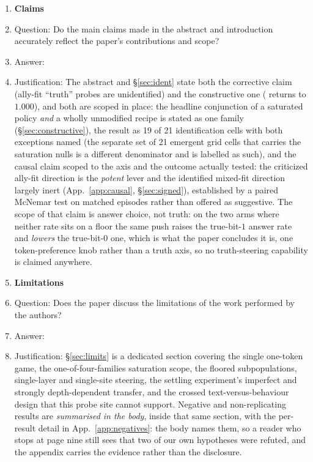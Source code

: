 \begin{enumerate}

\item {\bf Claims}
    \item[] Question: Do the main claims made in the abstract and introduction accurately reflect the paper's contributions and scope?
    \item[] Answer: \answerYes{}
    \item[] Justification: The abstract and \S\ref{sec:ident} state both the corrective claim (ally-fit ``truth'' probes are unidentified) and the constructive one (\tm{} returns to $1.000$), and both are scoped in place: the headline conjunction of a saturated policy \emph{and} a wholly unmodified recipe is stated as one family (\S\ref{sec:constructive}), the \tm{} result as 19 of 21 identification cells with both exceptions named (the separate set of 21 emergent grid cells that carries the saturation nulls is a different denominator and is labelled as such), and the causal claim scoped to the axis and the outcome actually tested: the criticized ally-fit direction is the \emph{potent} lever and the identified mixed-fit direction largely inert (App.~\ref{app:causal}, \S\ref{sec:signed}), established by a paired McNemar test on matched episodes rather than offered as suggestive. The scope of that claim is answer choice, not truth: on the two arms where neither rate sits on a floor the same push raises the true-bit-$1$ answer rate and \emph{lowers} the true-bit-$0$ one, which is what the paper concludes it is, one token-preference knob rather than a truth axis, so no truth-steering capability is claimed anywhere.
\item {\bf Limitations}
    \item[] Question: Does the paper discuss the limitations of the work performed by the authors?
    \item[] Answer: \answerYes{}
    \item[] Justification: \S\ref{sec:limits} is a dedicated section covering the single one-token game, the one-of-four-families saturation scope, the floored subpopulations, single-layer and single-site steering, the settling experiment's imperfect and strongly depth-dependent transfer, and the crossed text-versus-behaviour design that this probe site cannot support. Negative and non-replicating results are \emph{summarised in the body}, inside that same section, with the per-result detail in App.~\ref{app:negatives}: the body names them, so a reader who stops at page nine still sees that two of our own hypotheses were refuted, and the appendix carries the evidence rather than the disclosure.

\end{enumerate}
